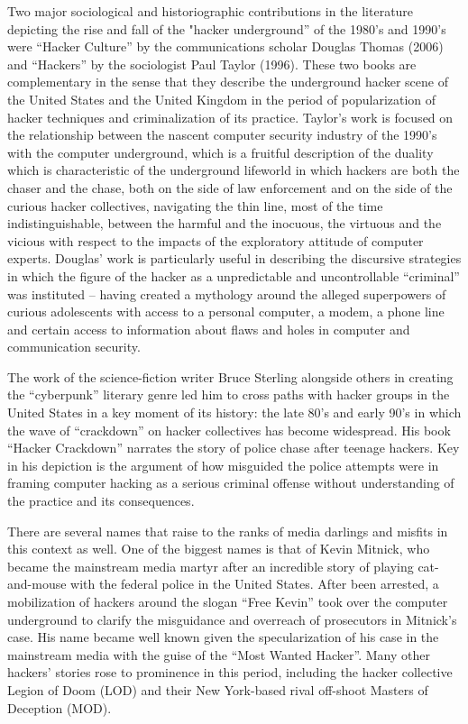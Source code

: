 \documentclass[10pt,letter,oneside]{scrartcl}
\begin{document}
Two major sociological and historiographic contributions in the literature
depicting the rise and fall of the "hacker underground'' of the 1980's and
1990's were ``Hacker Culture'' by the communications scholar Douglas Thomas
(2006) and ``Hackers'' by the sociologist Paul Taylor (1996). These two books
are complementary in the sense that they describe the underground hacker scene
of the United States and the United Kingdom in the period of popularization of
hacker techniques and criminalization of its practice. Taylor's work is focused
on the relationship between the nascent computer security industry of the
1990's with the computer underground, which is a fruitful description of the
duality which is characteristic of the underground lifeworld in which hackers
are both the chaser and the chase, both on the side of law enforcement and on
the side of the curious hacker collectives, navigating the thin line, most of
the time indistinguishable, between the harmful and the inocuous, the virtuous
and the vicious with respect to the impacts of the exploratory attitude of
computer experts.  Douglas' work is particularly useful in describing the
discursive strategies in which the figure of the hacker as a unpredictable and
uncontrollable ``criminal'' was instituted -- having created a mythology around
the alleged superpowers of curious adolescents with access to a personal
computer, a modem, a phone line and certain access to information about flaws
and holes in computer and communication security.

The work of the science-fiction writer Bruce Sterling alongside others in
creating the ``cyberpunk'' literary genre led him to cross paths with hacker
groups in the United States in a key moment of its history: the late 80's and
early 90's in which the wave of ``crackdown'' on hacker collectives has become
widespread. His book ``Hacker Crackdown'' narrates the story of police chase
after teenage hackers.  Key in his depiction is the argument of how misguided
the police attempts were in framing computer hacking as a serious criminal
offense without understanding of the practice and its consequences. 

There are several names that raise to the ranks of media darlings and misfits
in this context as well.  One of the biggest names is that of Kevin Mitnick,
who became the mainstream media martyr after an incredible story of playing
cat-and-mouse with the federal police in the United States.  After been
arrested, a mobilization of hackers around the slogan ``Free Kevin'' took over
the computer underground to clarify the misguidance and overreach of
prosecutors in Mitnick's case.  His name became well known given the
specularization of his case in the mainstream media with the guise of the
``Most Wanted Hacker''.  Many other hackers' stories rose to prominence in this
period, including the hacker collective Legion of Doom (LOD) and their New
York-based rival off-shoot Masters of Deception (MOD).
\end{document}
